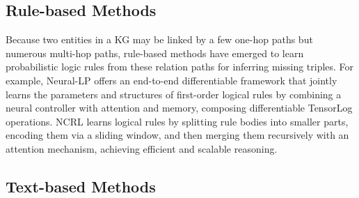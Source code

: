 \documentclass[11pt]{article}
\begin{document}
\subsection{Rule-based Methods}


Because two entities in a KG may be linked by a few one-hop paths but numerous multi-hop paths, rule-based methods have emerged to learn probabilistic logic rules from these relation paths for inferring missing triples. For example, Neural-LP \citep{yang2017differentiable} offers an end-to-end differentiable framework that jointly learns the parameters and structures of first-order logical rules by combining a neural controller with attention and memory, composing differentiable TensorLog operations. NCRL \citep{cheng2023neuralcompositionalrulelearning} learns logical rules by splitting rule bodies into smaller parts, encoding them via a sliding window, and then merging them recursively with an attention mechanism, achieving efficient and scalable reasoning. 


\subsection{Text-based Methods}

\end{document}
